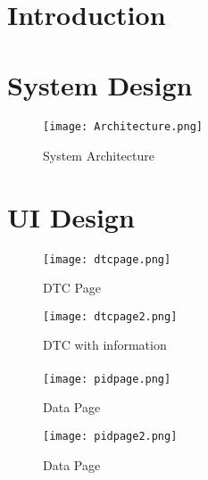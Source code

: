 \section{Introduction}
	\paragraph{}{
	
	}

\section{System Design}
	\paragraph{}{
		\begin{figure}[h]
			\begin{center}
				\texttt{[image: Architecture.png]}
				\caption{System Architecture}
			\end{center}
		\end{figure}
	}

\section{UI Design}
	\paragraph{}{
	}	
	\paragraph{}{
		\begin{figure}[h]
			\begin{center}								
				\begin{minipage}{0.49\textwidth}
					\texttt{[image: dtcpage.png]}
					\caption{DTC Page}						
				\end{minipage}
				\hfill			
				\begin{minipage}{0.49\textwidth}
					\texttt{[image: dtcpage2.png]}
					\caption{DTC with information}						
				\end{minipage}									
			\end{center}
		\end{figure}
	}
	\paragraph{}{
		\begin{figure}[h]
			\begin{center}								
				\begin{minipage}{0.49\textwidth}
					\texttt{[image: pidpage.png]}
					\caption{Data Page}						
				\end{minipage}
				\hfill			
				\begin{minipage}{0.49\textwidth}
					\texttt{[image: pidpage2.png]}
					\caption{Data Page}						
				\end{minipage}									
			\end{center}
		\end{figure}
	}